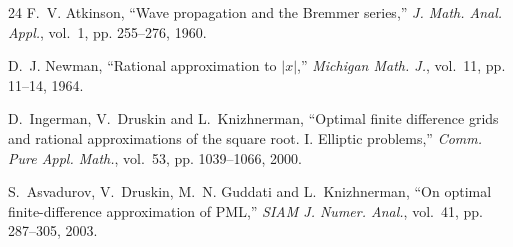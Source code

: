 \documentclass[11pt]{article}
\begin{document}
\begin{thebibliography}{24}
F.~V. Atkinson, ``Wave propagation and the Bremmer series,'' \emph{J. Math.
  Anal. Appl.}, vol.~1, pp. 255--276, 1960.

D.~J. Newman, ``Rational approximation to $|x|$,'' \emph{Michigan Math. J.},
  vol.~11, pp. 11--14, 1964.

D.~Ingerman, V.~Druskin and L.~Knizhnerman, ``Optimal finite difference grids
  and rational approximations of the square root. I. Elliptic problems,''
  \emph{Comm. Pure Appl. Math.}, vol.~53, pp. 1039--1066, 2000.

S.~Asvadurov, V.~Druskin, M.~N. Guddati and L.~Knizhnerman, ``On optimal
  finite-difference approximation of {PML},'' \emph{SIAM J. Numer. Anal.},
  vol.~41, pp. 287--305, 2003.

\end{thebibliography}
\end{document}
